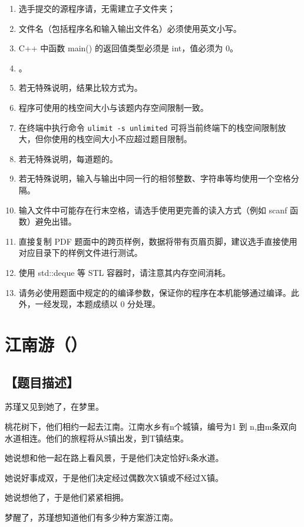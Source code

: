 \documentclass{statement}
\begin{document}
\begin{titlingpage}
        \Attention
        \begin{enumerate}
            \item 选手提交的源程序请，无需建立子文件夹；
            \item 文件名（包括程序名和输入输出文件名）必须使用英文小写。
            \item C++ 中函数 main() 的返回值类型必须是 int，值必须为 0。
            \item {}。
            \item 若无特殊说明，结果比较方式为。
            \item 程序可使用的栈空间大小与该题内存空间限制一致。
            \item 在终端中执行命令 \texttt{ulimit -s unlimited} 可将当前终端下的栈空间限制放大，但你使用的栈空间大小不应超过题目限制。
            \item 若无特殊说明，每道题的。
            \item 若无特殊说明，输入与输出中同一行的相邻整数、字符串等均使用一个空格分隔。
            \item 输入文件中可能存在行末空格，请选手使用更完善的读入方式（例如 scanf 函数）避免出错。
            \item 直接复制 PDF 题面中的跨页样例，数据将带有页眉页脚，建议选手直接使用对应目录下的样例文件进行测试。
            \item 使用 std::deque 等 STL 容器时，请注意其内存空间消耗。
            \item 请务必使用题面中规定的的编译参数，保证你的程序在本机能够通过编译。此外，一经发现，本题成绩以 0 分处理。
        \end{enumerate}
    \end{titlingpage}


    \section{江南游（）}
    \subsection[题目描述]{【题目描述】}
	苏瑾又见到她了，在梦里。\par
	 桃花树下，他们相约一起去江南。江南水乡有n个城镇，编号为1 到 n,由m条双向水道相连。他们的旅程将从S镇出发，到T镇结束。\par
	她说想和他一起在路上看风景，于是他们决定恰好k条水道。\par
	她说好事成双，于是他们决定经过偶数次X镇或不经过X镇。\par
	她说想他了，于是他们紧紧相拥。\par
	梦醒了，苏瑾想知道他们有多少种方案游江南。
	
\end{document}
